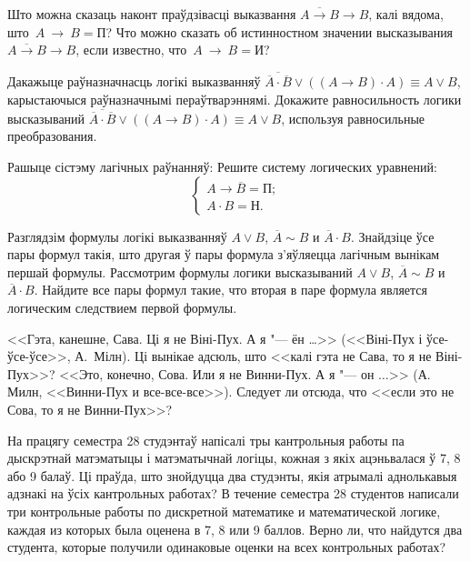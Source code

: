 \documentclass[12pt, a4paper]{article}
\begin{document}
\begin{problemList}

\problemItemSimple
{Што можна сказаць наконт праўдзівасці выказвання  $\overline{A \to B} \to B$, калі вядома, што~$A~\to~B = \mbox{П}$?}
{Что можно сказать об истинностном значении высказывания $\overline{A \to B} \to B$, если известно, что~$A~\to~B = \mbox{И}$?}

\bigskip

\problemItemSimple
{Дакажыце раўназначнасць логікі выказванняў $\overline{\overline{A} \cdot \overline{B}} \vee ((A \to B) \cdot A) \equiv A \vee B$,
карыстаючыся раўназначнымі пераўтварэннямі.}
{Докажите равносильность логики высказываний $\overline{\overline{A} \cdot \overline{B}} \vee ((A \to B) \cdot A) \equiv A \vee B$,
используя равносильные преобразования.}

\bigskip

\problemItemWithCommonPart
{Рашыце сістэму лагічных раўнанняў:}
{Решите систему логических уравнений:}
{\[\begin{cases} A \to \overline{B} = \mbox{П}; \\ A \cdot B = \mbox{Н}. \end{cases}\]}

\smallskip

\problemItemSimple
{Разглядзім формулы логікі выказванняў $A \vee B$, $\overline{A} \sim B$ и $\overline{A} \cdot B$.
Знайдзіце ўсе пары формул такія, што другая ў пары формула з'яўляецца лагічным вынікам першай формулы.}
{Рассмотрим формулы логики высказываний $A \vee B$, $\overline{A} \sim B$ и $\overline{A} \cdot B$.
Найдите все пары формул такие, что вторая в паре формула является логическим следствием первой формулы.}

\bigskip

\problemItemSimple
{<<Гэта, канешне, Сава. Ці я не Віні-Пух. А я "--- ён \dots>> (<<Віні-Пух і ўсе-ўсе-ўсе>>, А.~Мілн).
Ці вынікае адсюль, што <<калі гэта не Сава, то я не Віні-Пух>>?}
{<<Это, конечно, Сова. Или я не Винни-Пух. А я "--- он $\ldots$>> (А. Милн, <<Винни-Пух и все-все-все>>).
Следует ли отсюда, что <<если это не Сова, то я не Винни-Пух>>?}

\bigskip

\problemItemSimple
{На працягу семестра 28 студэнтаў напісалі тры кантрольныя работы па дыскрэтнай матэматыцы і матэматычнай логіцы,
кожная з якіх ацэньвалася ў 7, 8 або 9 балаў.
Ці праўда, што знойдуцца два студэнты, якія атрымалі аднолькавыя адзнакі на ўсіх кантрольных работах?}
{В течение семестра 28 студентов написали три контрольные работы по дискретной математике и математической логике,
каждая из которых была оценена в 7, 8 или 9 баллов.
Верно ли, что найдутся два студента, которые получили одинаковые оценки на всех контрольных работах?}


\end{problemList}
\end{document}

